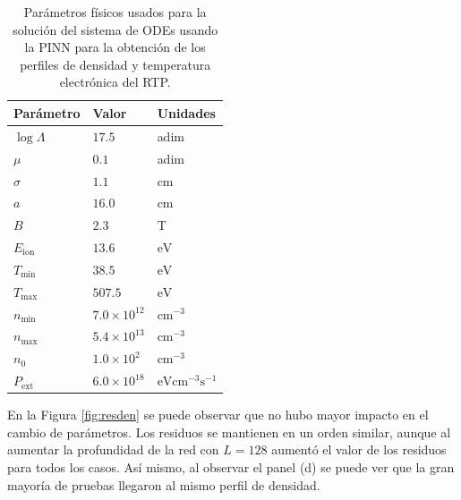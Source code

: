 \begin{table}[htb!]
\caption{Parámetros físicos usados para la solución del sistema de ODEs usando la PINN para la obtención de los perfiles de densidad y temperatura electrónica del RTP.}
\label{tab:physparams}
\begin{tabular}{lll}
\hline
{Parámetro} & {Valor}       & {Unidades} \\ \hline
$\log\Lambda$  & $17.5$               & adim              \\
$\mu$                & $0.1$                & adim              \\
$\sigma$           & $1.1$                & $\text{cm}$       \\
$a$                   & $16.0$               & $\text{cm}$       \\
$B$                  & $2.3$                & $\text{T}$        \\
$E_\text{ion}$         & $13.6$               & $\text{eV}$       \\ 
$T_\text{min}$         & $38.5$               & $\text{eV}$       \\
$T_\text{max}$        & $507.5$              & $\text{eV}$       \\
$n_\text{min}$         & $7.0 \times 10^{12}$ & $\text{cm}^{-3}$  \\
$n_\text{max}$        & $5.4\times 10^{13}$  & $\text{cm}^{-3}$  \\
$n_0$               & $1.0\times 10^{2}$   & $\text{cm}^{-3}$  \\
$P_\text{ext}$               & $6.0\times 10^{18}$ & $\text{eV}\text{cm}^{-3}\text{s}^{-1}$ \\ \hline
\end{tabular}
\end{table}

En la Figura \ref{fig:resden} se puede observar que no hubo mayor impacto en el cambio de parámetros. Los residuos se mantienen en un orden similar, aunque al aumentar la profundidad de la red con $L = 128$ aumentó el valor de los residuos para todos los casos. Así mismo, al observar el panel (d) se puede ver que la gran mayoría de pruebas llegaron al mismo perfil de densidad. 

